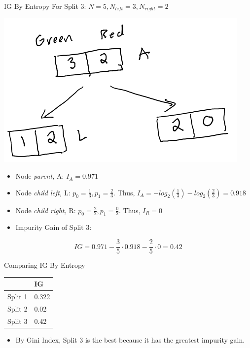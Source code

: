 \documentclass[
  ignorenonframetext,
]{beamer}
\providecommand{\tightlist}{%
  \setlength{\itemsep}{0pt}\setlength{\parskip}{0pt}}
\begin{document}
\begin{frame}{IG By Entropy}
\protect\hypertarget{ig-by-entropy-2}{}
For Split 3: \(N = 5, N_{left} =3, N_{right} = 2\)

\includegraphics{images/im2.png}

\begin{itemize}
\item
  Node \emph{parent,} A: \(I_{A} = 0.971\)
\item
  Node \emph{child left,} L: \(p_0 = \frac{1}{3}, p_1 = \frac{2}{3}\).
  Thus, \(I_{A} = -log_2(\frac{1}{3}) -log_2(\frac{2}{3}) = 0.918\)
\item
  Node \emph{child right,} R: \(p_0 = \frac{2}{2}, p_1 = \frac{0}{2}\).
  Thus, \(I_{R} = 0\)
\item
  Impurity Gain of Split 3:
\end{itemize}

\[IG = 0.971 - \frac{3}{5} \cdot 0.918 - \frac{2}{5} \cdot 0 = 0.42\]
\end{frame}

\begin{frame}{Comparing IG By Entropy}
\protect\hypertarget{comparing-ig-by-entropy}{}
\begin{longtable}[]{@{}ll@{}}
\toprule
& IG \\
\midrule
\endhead
Split 1 & 0.322 \\
Split 2 & 0.02 \\
Split 3 & 0.42 \\
\bottomrule
\end{longtable}

\begin{itemize}
\tightlist
\item
  By Gini Index, Split 3 is the best because it has the greatest
  impurity gain.
\end{itemize}
\end{frame}
\end{document}
